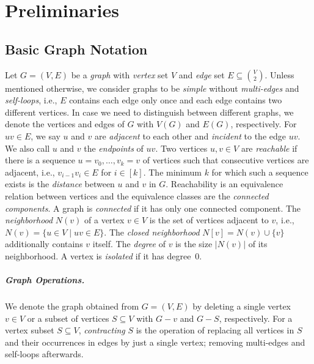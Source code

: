 \documentclass[11pt]{article}
\begin{document}
\section{Preliminaries}\label{sec:preliminaries}
%
\subsection{Basic Graph Notation}
%
Let $G = (V, E)$ be a \emph{graph} with \emph{vertex} set $V$ and \emph{edge} set $E \subseteq \binom{V}{2}$.
Unless mentioned otherwise, we consider graphs to be \emph{simple} without \emph{multi-edges} and \emph{self-loops}, i.e., $E$ contains each edge only once and each edge contains two different vertices.
In case we need to distinguish between different graphs, we denote the vertices and edges of $G$ with $V(G)$ and $E(G)$, respectively.
For $uv \in E$, we say $u$ and $v$ are \emph{adjacent} to each other and \emph{incident} to the edge $uv$.
We also call $u$ and $v$ the \emph{endpoints} of $uv$.
%
Two vertices $u, v \in V$ are \emph{reachable} if there is a sequence $u = v_0, \dots, v_k = v$ of vertices such that consecutive vertices are adjacent, i.e., $v_{i - 1}v_i \in E$ for $i \in [k]$.
The minimum $k$ for which such a sequence exists is the \emph{distance} between $u$ and $v$ in $G$.
Reachability is an equivalence relation between vertices and the equivalence classes are the \emph{connected components}.
A graph is \emph{connected} if it has only one connected component.
%
%
The \emph{neighborhood} $N(v)$ of a vertex $v \in V$ is the set of vertices adjacent to $v$, i.e., $N(v) = \{u \in V \mid uv \in E\}$.
The \emph{closed neighborhood} $N[v] = N(v) \cup \{v\}$ additionally contains $v$ itself.
The \emph{degree} of $v$ is the size $|N(v)|$ of its neighborhood.
A vertex is \emph{isolated} if it has degree~$0$.  
%
\subparagraph{Graph Operations.}
%
We denote the graph obtained from $G = (V, E)$ by deleting a single vertex $v \in V$ or a subset of vertices $S \subseteq V$ with $G - v$ and $G - S$, respectively.
For a vertex subset $S \subseteq V$, \emph{contracting} $S$ is the operation of replacing all vertices in $S$ and their occurrences in edges by just a single vertex; removing multi-edges and self-loops afterwards.
\end{document}
